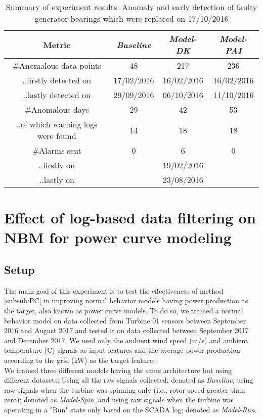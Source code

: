 \begin{table}[H]
    \centering
    \begin{tabular}{|c|c|c|c|}
        \hline
            \textbf{Metric} & \textbf{\emph{Baseline}} & \textbf{\emph{Model-DK}} & \textbf{\emph{Model-PAI}}\\
            \hline
            \#Anomalous data points & 48 & 217 & 236\\
            \hline
            ..firstly detected on & 17/02/2016 & 16/02/2016 & 16/02/2016\\
            \hline
            ..lastly detected on & 29/09/2016 & 06/10/2016 & 11/10/2016\\
            \hline
            \#Anomalous days & 29 & 42 & 53\\
            \hline
            ..of which warning logs were found & 14 & 18 & 18\\
            \hline
            \#Alarms sent & 0 & 6 & 0\\
            \hline
            ..firstly on & \- & 19/02/2016 & \-\\
            \hline
            ..lastly on & \- & 23/08/2016 & \-\\
        \hline
    \end{tabular}
    \caption{Summary of experiment results: Anomaly and early detection of faulty generator bearings which were replaced on 17/10/2016}
    \label{tab:summary_expIII}
\end{table}

\section{Effect of log-based data filtering on NBM for power curve modeling}
    \label{sec:Experiment IV}
    \subsection{Setup}
    The main goal of this experiment is to test the effectiveness of method \ref{subsub:PC} in improving normal behavior models 
    having power production as the target, also known as power curve models. To do so, we trained a normal behavior model on 
    data collected from Turbine 01 sensors between September 2016 and August 2017 and tested it on data collected between September 2017 
    and December 2017. We used only the ambient wind speed (m/s) and ambient temperature (\degree C) signals as input features 
    and the average power production according to the grid (kW) as the target feature.\\
    We trained three different models having the same architecture but using different datasets: 
    Using all the raw signals collected; denoted as \emph{Baseline}, 
    using raw signals when the turbine was spinning only (i.e., rotor speed greater than zero); denoted as \emph{Model-Spin},
    and using raw signals when the turbine was operating in a "Run" state only based on the SCADA log; denoted as \emph{Model-Run}.\\

